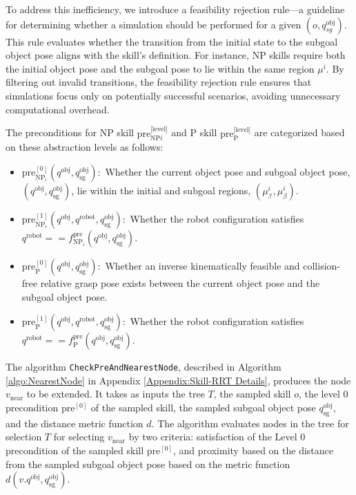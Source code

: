 

To address this inefficiency, we introduce a feasibility rejection rule—a guideline for determining whether a simulation should be performed for a given $(o, q^\text{obj}_{sg})$. This rule evaluates whether the transition from the initial state to the subgoal object pose aligns with the skill’s definition. For instance, NP skills require both the initial object pose and the subgoal pose to lie within the same region \( \mu^i \). By filtering out invalid transitions, the feasibility rejection rule ensures that simulations focus only on potentially successful scenarios, avoiding unnecessary computational overhead.

The preconditions for NP skill $\text{pre}^\text{[level]}_{\text{NP}i}$ and P skill $\text{pre}^\text{[level]}_{\text{P}}$ are categorized based on these abstraction levels as follows:

\begin{itemize}
    \item $\text{pre}^{[0]}_{\text{NP}_i}(q^\text{obj}, q^\text{obj}_\text{sg}): $ Whether the current object pose and subgoal object pose, $(q^{\text{obj}}, q^{\text{obj}}_{\text{sg}})$, lie within the initial and subgoal regions, $(\mu^i_{\mathcal{I}}, \mu^i_\beta)$.
    \item $\text{pre}^{[1]}_{\text{NP}_i}(q^\text{obj}, q^\text{robot}, q^\text{obj}_\text{sg}): $ Whether the robot configuration satisfies $q^{\text{robot}} == f^{\text{pre}}_{\text{NP}_i}(q^{\text{obj}}, q^{\text{obj}}_{\text{sg}})$.
    \vspace{1em}
\end{itemize}

\begin{itemize}
    \item $\text{pre}^{[0]}_{\text{P}}(q^\text{obj}, q^\text{obj}_\text{sg}): $ Whether an inverse kinematically feasible and collision-free relative grasp pose exists between the current object pose and the subgoal object pose.
    \item $\text{pre}^{[1]}_{\text{P}}(q^\text{obj}, q^\text{robot}, q^\text{obj}_\text{sg}): $ Whether the robot configuration satisfies $q^{\text{robot}} == f^{\text{pre}}_{\text{P}}(q^{\text{obj}}, q^{\text{obj}}_{\text{sg}})$.
    \vspace{1em}
\end{itemize}

The algorithm \texttt{CheckPreAndNearestNode}, described in Algorithm \ref{algo:NearestNode} in Appendix \ref{Appendix:Skill-RRT Details}, produces the node $v_{\text{near}}$ to be extended. It takes as inputs the tree $T$, the sampled skill $o$, the level 0 precondition $\text{pre}^{[0]}$ of the sampled skill, the sampled subgoal object pose $q^\text{obj}_\text{sg}$, and the distance metric function $d$. The algorithm evaluates nodes in the tree for selection \( T \) for selecting $v_\text{near}$ by two criteria: satisfaction of the Level 0 precondition of the sampled skill $\text{pre}^{[0]}$, and proximity based on the distance from the sampled subgoal object pose based on the metric function \( d (v.q^\text{obj}, q^{\text{obj}}_{\text{sg}}) \).

